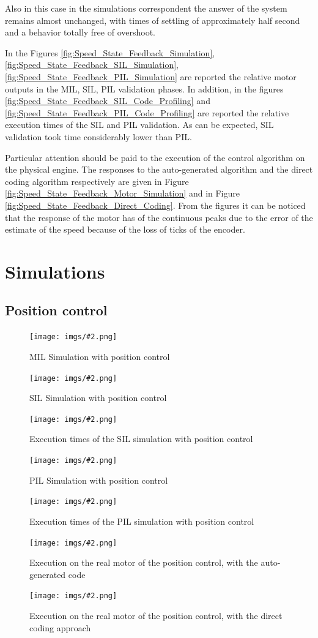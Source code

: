 \documentclass[11pt,a4paper,oneside]{extarticle}
\newcommand\img[3]{
    \begin{figure}[H]\centering
        \texttt{[image: imgs/\#2.png]}
        \caption{#3}
        \label{fig:#2}
    \end{figure}
}
\begin{document}
Also in this case in the simulations correspondent the answer of 
the system remains almost unchanged, with times of settling of 
approximately half second and a behavior totally free of overshoot.
\bigskip

In the Figures \ref{fig:Speed_State_Feedback_Simulation}, 
\ref{fig:Speed_State_Feedback_SIL_Simulation}, 
\ref{fig:Speed_State_Feedback_PIL_Simulation} are reported the relative 
motor outputs in the MIL, SIL, PIL validation phases. 
In addition, in the figures 
\ref{fig:Speed_State_Feedback_SIL_Code_Profiling} and
\ref{fig:Speed_State_Feedback_PIL_Code_Profiling} are reported 
the relative execution times of the SIL and PIL validation. 
As can be expected, SIL validation took time considerably lower than 
PIL.\bigskip

Particular attention should be paid to the execution of the control 
algorithm on the physical engine. The responses to the auto-generated 
algorithm and the direct coding algorithm respectively are given in 
Figure \ref{fig:Speed_State_Feedback_Motor_Simulation} and in Figure 
\ref{fig:Speed_State_Feedback_Direct_Coding}. From the figures it can 
be noticed that the response of the motor has of the continuous peaks 
due to the error of the estimate of the speed because of the loss of 
ticks of the encoder.

\newpage
\appendix
\section{Simulations}
\subsection{Position control}

\img{1}{Position_State_Feedback_Simulation}{MIL Simulation with position control}
\img{1}{Position_State_Feedback_SIL_Simulation}{SIL Simulation with position control}
\img{1}{Position_State_Feedback_SIL_Code_Profiling}{Execution times of the SIL simulation with position control}
\img{1}{Position_State_Feedback_PIL_Simulation}{PIL Simulation with position control}
\img{1}{Position_State_Feedback_PIL_Code_Profiling}{Execution times of the PIL simulation with position control}
\img{1}{Position_State_Feedback_Motor_Simulation}{Execution on the real motor of the position control, with the auto-generated code}
\img{1}{Position_State_Feedback_Direct_Coding}{Execution on the real motor of the position control, with the direct coding approach}
\end{document}
